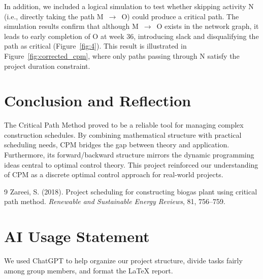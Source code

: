 \documentclass[12pt]{article}
\begin{document}
In addition, we included a logical simulation to test whether skipping activity N (i.e., directly taking the path M~$\rightarrow$~O) could produce a critical path. The simulation results confirm that although M~$\rightarrow$~O exists in the network graph, it leads to early completion of O at week 36, introducing slack and disqualifying the path as critical (Figure~\ref{fig:4}). This result is illustrated in Figure~\ref{fig:corrected_cpm}, where only paths passing through N satisfy the project duration constraint.

\section{Conclusion and Reflection}
The Critical Path Method proved to be a reliable tool for managing complex construction schedules. By combining mathematical structure with practical scheduling needs, CPM bridges the gap between theory and application. Furthermore, its forward/backward structure mirrors the dynamic programming ideas central to optimal control theory. This project reinforced our understanding of CPM as a discrete optimal control approach for real-world projects.

\begin{thebibliography}{9}
Zareei, S. (2018). Project scheduling for constructing biogas plant using critical path method. \textit{Renewable and Sustainable Energy Reviews}, 81, 756--759.
\end{thebibliography}

\section*{AI Usage Statement}

We used ChatGPT to help organize our project structure, divide tasks fairly among group members, and format the LaTeX report. 
\end{document}
